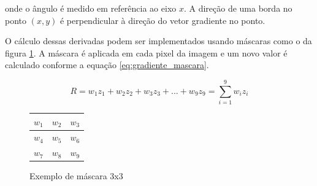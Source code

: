 onde o ângulo é medido em referência ao eixo \(x\). A direção de uma borda no ponto \((x,y)\) é perpendicular à direção do vetor gradiente no ponto.

O cálculo dessas derivadas podem ser implementados usando máscaras como o da figura \ref{fig:gradiente_mascara}. A máscara é aplicada em cada pixel da imagem e um novo valor é calculado conforme a equação \ref{eq:gradiente_mascara}.

\begin{equation}
R = w_1 z_1 + w_2 z_2 + w_3 z_3 + ... +w_9 z_9 = \sum_{i=1}^{9}{w_iz_i}
\label{eq:gradiente_mascara}
\end{equation}

\begin{figure}
\begin{center}
\begin{tabular}{| l |c | r |}
\hline
\(w_1\) & \(w_2\) & \(w_3\) \\ \hline
\(w_4\) & \(w_5\) & \(w_6\) \\ \hline
\(w_7\) & \(w_8\) & \(w_9\) \\ \hline
\end{tabular}
\end{center}
\caption{Exemplo de máscara 3x3}
\label{fig:gradiente_mascara}
\end{figure}


